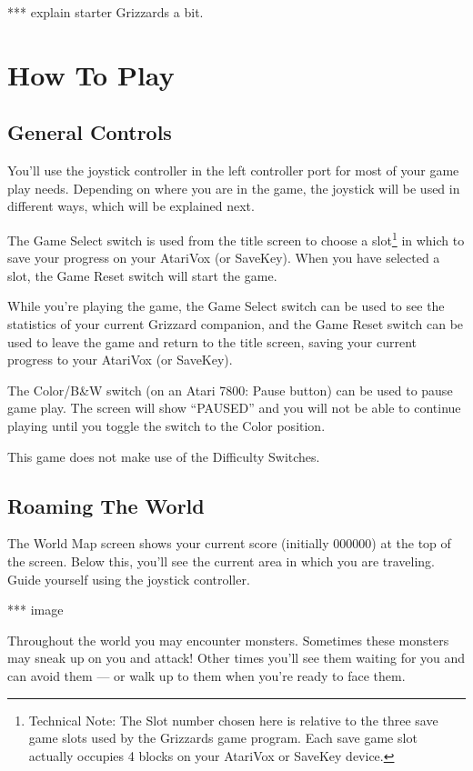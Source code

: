 \documentclass[10pt,twoside,openright]{memoir}
\begin{document}
*** explain starter Grizzards a bit.


\chapter{How To Play}

\section{General Controls}

You'll use the joystick controller in the left controller port for most of
your game play needs. Depending on where you are in the game, the joystick
will be used in different ways, which will be explained next.

The  Game  Select  switch  is  used from  the  title  screen  to  choose
a slot\footnote{Technical Note: The Slot  number chosen here is relative
  to  the three  save game  slots used  by the  Grizzards game  program.
  Each save  game slot actually  occupies 4  blocks on your  AtariVox or
  SaveKey device.} in  which to save your progress on  your AtariVox (or
SaveKey). When  you have  selected a  slot, the  Game Reset  switch will
start the game.

While you're playing the game, the Game Select switch can be used to see the
statistics of your current Grizzard companion, and the Game Reset switch can
be used to leave the game and return to the title screen, saving your
current progress to your AtariVox (or SaveKey).

The Color/B&W switch (on an Atari 7800: Pause button) can be used to pause
game play. The screen will show ``PAUSED'' and you will not be able to
continue playing until you toggle the switch to the Color position.

This game does not make use of the Difficulty Switches.


\section{Roaming The World}

The World Map screen shows your current score (initially 000000) at the top
of the screen.  Below this, you'll see the current area in which you are
traveling.  Guide yourself using the joystick controller.

*** image

Throughout the world you may encounter monsters. Sometimes these monsters
may sneak up on you and attack! Other times you'll see them waiting for you
and can avoid them --- or walk up to them when you're ready to face them.
\end{document}
